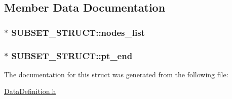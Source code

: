 \subsection{Member Data Documentation}
\hypertarget{structSUBSET__STRUCT_a61f3350ae28b746fea56129536e73ec1}{
\subsubsection[{nodes\-\_\-list}]{$\ast$ S\-U\-B\-S\-E\-T\-\_\-\-S\-T\-R\-U\-C\-T\-::nodes\-\_\-list}}\label{structSUBSET__STRUCT_a61f3350ae28b746fea56129536e73ec1}
\hypertarget{structSUBSET__STRUCT_a8023cbde4ffe195b6fa3fd9a7c3211f6}{
\subsubsection[{pt\-\_\-end}]{$\ast$ S\-U\-B\-S\-E\-T\-\_\-\-S\-T\-R\-U\-C\-T\-::pt\-\_\-end}}\label{structSUBSET__STRUCT_a8023cbde4ffe195b6fa3fd9a7c3211f6}


The documentation for this struct was generated from the following file\-:\begin{DoxyCompactItemize}
\item 
\hyperlink{DataDefinition_8h}{Data\-Definition.\-h}\end{DoxyCompactItemize}
